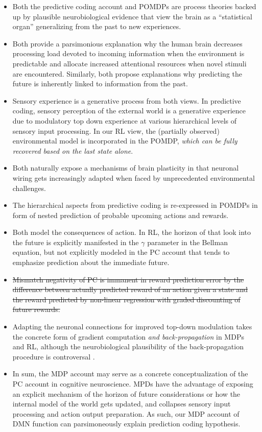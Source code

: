 \documentclass[10pt,letterpaper]{article}
\newcommand{\suggestremove}[1]{{\color{red} \sout{#1}}}
\begin{document}
\begin{itemize}
  \item Both the predictive coding account and POMDPs
  are process theories backed up by plausible
  neurobiological evidence that
  view the brain as a ``statistical organ''
  generalizing from the past to new experiences.
  \item Both provide a parsimonious explanation why the
  human brain decreases processing load devoted to incoming information
  when the environment is predictable and allocate increased
  attentional resources when novel stimuli are encountered.
  Similarly, both propose explanations why
  predicting the future is inherently
  linked to information from the past.
  \item Sensory experience is a generative process from both views.
  In predictive coding, sensory perception of the external world
  is a generative experience due to modulatory top down experience at
  various hierarchical levels of sensory input processing.
  In our RL view, the (partially observed)
  environmental model is incorporated in the POMDP,
  \textit{which can be fully recovered based on the last
  state alone}.
  \item Both naturally expose a mechanisms of brain plasticity in that
  neuronal wiring gets increasingly adapted
  when faced by unprecedented environmental
  challenges.
  \item The hierarchical aspects from predictive coding
  is re-expressed in POMDPs in form of
  nested prediction of probable upcoming actions and rewards.
  \item Both model the consequences of action. In RL, the horizon of that
  look into the future is explicitly manifested in the $\gamma$ parameter
  in the Bellman equation, but not
  explicitly modeled in the PC account that
  tends to emphasize prediction about the
  immediate future.
  \item \suggestremove{Mismatch negativity of PC is immanent in reward prediction error
  by the difference between actually predicted reward of an action given
  a state and the reward predicted by non-linear regression with graded
  discounting of future rewards.}
  \item Adapting the neuronal connections for improved top-down modulation
  takes the concrete form of gradient computation
  \textit{and back-propagation} in MDPs and RL,
  although the neurobiological plausibility of
  the back-propagation procedure is controversal
  \citep{goodfellow2016deep}.
  \item In sum,
  the MDP account may serve as a concrete conceptualization of the PC account
  in cognitive neuroscience. MPDs have the advantage of exposing an explicit
  mechanism of the horizon of future considerations or
  how the internal model of the world gets updated,
  and collapses sensory input processing and action output preparation.
  As such, our MDP account of DMN function can parsimoneously explain
  prediction coding hypothesis.
\end{itemize}
\end{document}

